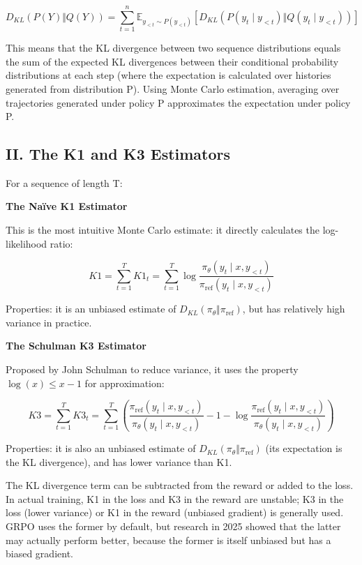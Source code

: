 \[
D_{KL}(P(Y) \Vert Q(Y))
=\sum_{t=1}^{n}\mathbb{E}_{y_{<t}\sim P(y_{<t})}\left[
D_{KL}\left(P(y_t\mid y_{<t}) \Vert Q(y_t\mid y_{<t})\right)
\right]
\]

This means that the KL divergence between two sequence distributions equals the sum of the expected KL divergences between their conditional probability distributions at each step (where the expectation is calculated over histories generated from distribution P). Using Monte Carlo estimation, averaging over trajectories generated under policy P approximates the expectation under policy P.

\hypertarget{ii.-the-k1-and-k3-estimators}{%
\subsection{II. The K1 and K3 Estimators}\label{ii.-the-k1-and-k3-estimators}}

For a sequence of length T:

\textbf{The Naïve K1 Estimator}

This is the most intuitive Monte Carlo estimate: it directly calculates the log-likelihood ratio:

\[
K1=\sum_{t=1}^{T}K1_t
=\sum_{t=1}^{T}\log\frac{\pi_\theta(y_t\mid x,y_{<t})}{\pi_{\mathrm{ref}}(y_t\mid x,y_{<t})}
\]

Properties: it is an unbiased estimate of \(D_{KL}(\pi_\theta \Vert \pi_{\mathrm{ref}})\), but has relatively high variance in practice.

\textbf{The Schulman K3 Estimator}

Proposed by John Schulman to reduce variance, it uses the property \(\log(x)\le x-1\) for approximation:

\[
K3=\sum_{t=1}^{T}K3_t
=\sum_{t=1}^{T}\left(
\frac{\pi_{\mathrm{ref}}(y_t\mid x,y_{<t})}{\pi_\theta(y_t\mid x,y_{<t})}
-1
-\log\frac{\pi_{\mathrm{ref}}(y_t\mid x,y_{<t})}{\pi_\theta(y_t\mid x,y_{<t})}
\right)
\]

Properties: it is also an unbiased estimate of \(D_{KL}(\pi_\theta \Vert \pi_{\mathrm{ref}})\) (its expectation is the KL divergence), and has lower variance than K1.

The KL divergence term can be subtracted from the reward or added to the loss. In actual training, K1 in the loss and K3 in the reward are unstable; K3 in the loss (lower variance) or K1 in the reward (unbiased gradient) is generally used. GRPO uses the former by default, but research in 2025 showed that the latter may actually perform better, because the former is itself unbiased but has a biased gradient.

